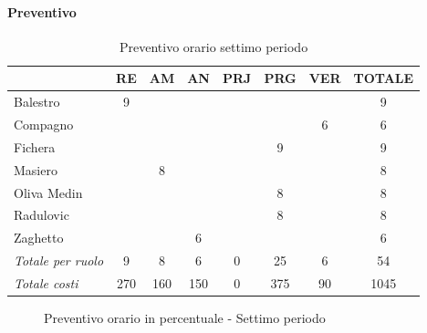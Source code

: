 \documentclass[a4paper,12pt]{article}
\begin{document}
            \paragraph{Preventivo}
                \begin{table}[H]
                \centering
                \caption{Preventivo orario settimo periodo}
                \begin{tabular}{|l|c|c|c|c|c|c|c|}
                \hline
                    \rowcolor{lightgray}{\textbf{Membro}} & {\textbf{RE}} & {\textbf{AM}} & {\textbf{AN}} & {\textbf{PRJ}} & {\textbf{PRG}} & {\textbf{VER}} & {\textbf{TOTALE}}\\
                \hline
                    Balestro & 9 & & & & & & 9\\
                \hline
                    Compagno & & & & & & 6 & 6\\
                \hline
                    Fichera & & & & & 9 & & 9\\
                \hline
                    Masiero & & 8 & & & & & 8\\
                \hline
                    Oliva Medin & & & & & 8 & & 8\\
                \hline
                    Radulovic & & & & & 8 & & 8\\
                \hline
                    Zaghetto & & & 6 & & & & 6\\
                \hline
                    \rowcolor{lightgray}\textit{Totale per ruolo} & 9 & 8 & 6 & 0 & 25 & 6 & 54\\
                \hline
                    \rowcolor{lightgray}\textit{Totale costi} & 270 & 160 & 150 & 0 & 375 & 90 & 1045\\
                \hline
                \end{tabular}
                \end{table}

                \begin{figure}[H]
                \centering
                \caption{Preventivo orario in percentuale - Settimo periodo}
                \end{figure}
                
\end{document}

